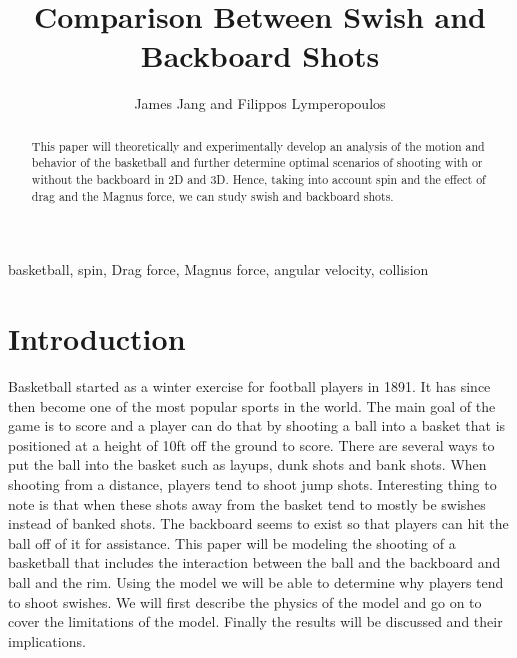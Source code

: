 \documentclass[twocolumn]{IEEEtran}
\begin{document}
\title{Comparison Between Swish and Backboard Shots}

\author{James Jang and Filippos Lymperopoulos}


\maketitle
\begin{abstract} 

This paper will theoretically and experimentally develop an analysis of the motion and behavior of the basketball and further determine optimal scenarios of shooting with or without the backboard in 2D and 3D. Hence, taking into account spin and the effect of drag and the Magnus force, we can study swish and backboard shots.

\end{abstract}

\begin{keywords}
basketball, spin, Drag force, Magnus force, angular velocity, collision
\end{keywords}

\section{Introduction}

Basketball started as a winter exercise for football players in 1891. It has since then become one of the most popular sports in the world. The main goal of the game is to score and a player can do that by shooting a ball into a basket that is positioned at a height of 10ft off the ground to score. There are several ways to put the ball into the basket such as layups, dunk shots and bank shots. When shooting from a distance, players tend to shoot jump shots. Interesting thing to note is that when these shots away from the basket tend to mostly be swishes instead of banked shots. The backboard seems to exist so that players can hit the ball off of it for assistance. This paper will be modeling the shooting of a basketball that includes the interaction between the ball and the backboard and ball and the rim. Using the model we will be able to determine why players tend to shoot swishes. We will first describe the physics of the model and go on to cover the limitations of the model. Finally the results will be discussed and their implications.
\end{document}
